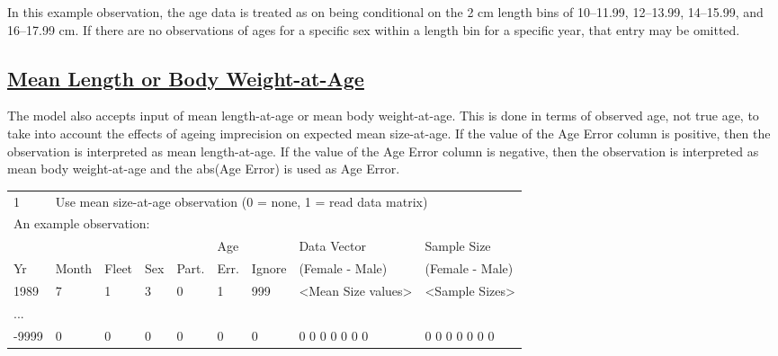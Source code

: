 In this example observation, the age data is treated as on being conditional on the 2 cm length bins of 10--11.99, 12--13.99, 14--15.99, and 16--17.99 cm. If there are no observations of ages for a specific sex within a length bin for a specific year, that entry may be omitted.

\hypertarget{MeanLorBWatA}{}
\subsection[Mean Length or Body Weight-at-Age]{\protect\hyperlink{MeanLorBWatA}{Mean Length or Body Weight-at-Age}}
The model also accepts input of mean length-at-age or mean body weight-at-age. This is done in terms of observed age, not true age, to take into account the effects of ageing imprecision on expected mean size-at-age. If the value of the Age Error column is positive, then the observation is interpreted as mean length-at-age. If the value of the Age Error column is negative, then the observation is interpreted as mean body weight-at-age and the abs(Age Error) is used as Age Error.

\begin{center}
	\begin{tabular}{p{0.75cm} p{1cm} p{0.75cm} p{1cm} p{0.75cm} p{1cm} p{1cm} p{3.2cm} p{3.2cm}}
		\hline
		1 & \multicolumn{8}{l}{Use mean size-at-age observation (0 = none, 1 = read data matrix)} \Tstrut\\
		\multicolumn{9}{l}{An example observation:} \Bstrut\\
		\hline
		   &       &       &     &       & Age  &        & Data Vector     & Sample Size \Tstrut\\
		Yr & Month & Fleet & Sex & Part. & Err. & Ignore & (Female - Male) & (Female - Male) \Bstrut\\
		\hline
		1989  & 7 & 1 & 3 & 0 & 1 & 999 & <Mean Size values> & <Sample Sizes> \Tstrut\\
		...   &   &   &   &   &   &   &  & \\
		-9999 & 0 & 0 & 0 & 0 & 0 & 0 & 0 0 0 0 0 0 0 & 0 0 0 0 0 0 0 \Bstrut\\
		\hline
	\end{tabular}
	\leavevmode\tagmcend\tagstructend\par
\end{center}


